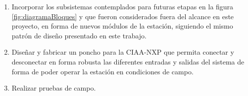 \begin{enumerate}
  \item Incorporar los subsistemas contemplados para futuras etapas en la figura \ref{fig:diagramaBloques} y que fueron considerados fuera del alcance en este proyecto, en forma de nuevos módulos de la estación, siguiendo el mismo patrón de diseño presentado en este trabajo.
  \item Diseñar y fabricar un poncho para la CIAA-NXP que permita conectar y desconectar en forma robusta las diferentes entradas y salidas del sistema de forma de poder operar la estación en condiciones de campo.
  \item Realizar pruebas de campo. 
\end{enumerate}


